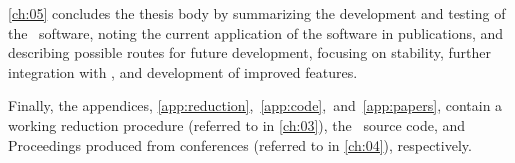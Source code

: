 \autoref{ch:05} concludes the thesis body by summarizing the development and testing of the \stops\ software, noting the current application of the software in publications, and describing possible routes for future development, focusing on stability, further integration with \polsalt, and development of improved features.

Finally, the appendices, \autoref{app:reduction},~\ref{app:code},~and~\ref{app:papers}, contain a working reduction procedure (referred to in \autoref{ch:03}), the \stops\ source code, and Proceedings produced from conferences (referred to in \autoref{ch:04}), respectively.
